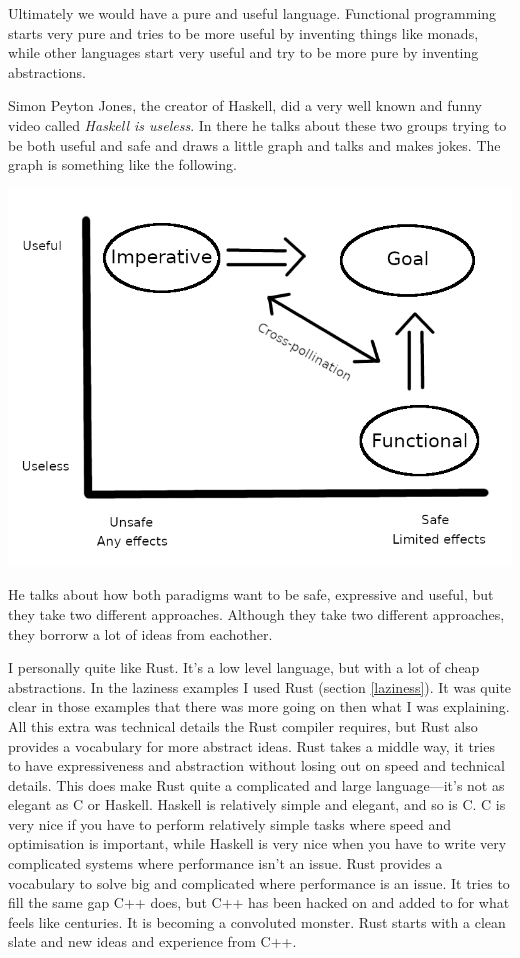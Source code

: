 \documentclass[11pt]{article}
\begin{document}
Ultimately we would have a pure and useful language. Functional programming
starts very pure and tries to be more useful by inventing things like monads,
while other languages start very useful and try to be more pure by inventing
abstractions.

Simon Peyton Jones, the creator of Haskell, did a very well known and funny
video called \emph{Haskell is useless}. In there he talks about these two
groups trying to be both useful and safe and draws a little graph and talks and
makes jokes. The graph is something like the following.


\begin{center}
	\includegraphics[scale=1.3]{useless}
\end{center}

He talks about how both paradigms want to be safe, expressive and useful, but
they take two different approaches. Although they take two different
approaches, they borrorw a lot of ideas from eachother.

I personally quite like Rust. It's a low level language, but with a lot of
cheap abstractions. In the laziness examples I used Rust (section
\ref{laziness}). It was quite clear in those examples that there was more going
on then what I was explaining. All this extra was technical details the Rust
compiler requires, but Rust also provides a vocabulary for more abstract ideas.
Rust takes a middle way, it tries to have expressiveness and abstraction
without losing out on speed and technical details. This does make Rust quite a
complicated and large language---it's not as elegant as C or Haskell. Haskell
is relatively simple and elegant, and so is C. C is very nice if you have to
perform relatively simple tasks where speed and optimisation is important,
while Haskell is very nice when you have to write very complicated systems
where performance isn't an issue. Rust provides a vocabulary to solve big and
complicated where performance is an issue. It tries to fill the same gap C++
does, but C++ has been hacked on and added to for what feels like centuries. It
is becoming a convoluted monster. Rust starts with a clean slate and new ideas
and experience from C++.
\end{document}
